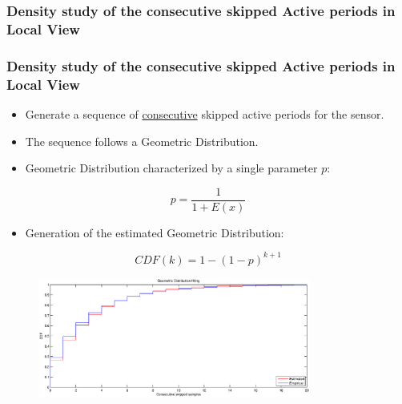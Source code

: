\documentclass[9pt,handout,serif]{beamer}
\begin{document}
\subsubsection*{Density study of the consecutive skipped Active periods in Local View}
\begin{frame}[c]
	\frametitle{Density study of the consecutive skipped Active periods in Local View}
	\begin{itemize}
		\item Generate a sequence of \underline{consecutive} skipped active periods for the sensor.
		\item The sequence follows a Geometric Distribution.
		\item Geometric Distribution characterized by a single parameter $p$:
	\end{itemize}
	\begin{equation}
		p = \frac{1}{1+E(x)}
	\end{equation}
	\begin{itemize}
		\item Generation of the estimated Geometric Distribution:
	\end{itemize}
	\begin{equation}
		CDF(k) = 1-(1-p)^{k+1}
	\end{equation}
	\begin{figure}
		\centering
		\includegraphics[width=0.8\textwidth]{../images/results/autocorrelation/localview/geometric}
	\end{figure}
\end{frame}
\end{document}

